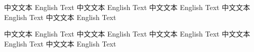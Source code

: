 \documentclass{neocv}
\begin{document}
\section{}
中文文本 English Text 中文文本 English Text 中文文本 English Text 中文文本 English Text 中文文本 English Text 

中文文本 English Text 中文文本 English Text 中文文本 English Text 中文文本 English Text 中文文本 English Text 

\newpage
\end{document}
